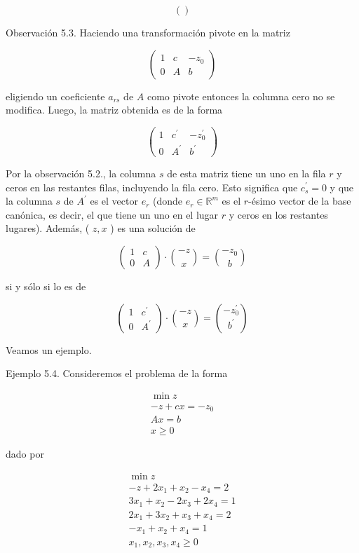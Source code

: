 \documentclass[10pt]{article}
\begin{document}
$$
\left(\right)
$$

Observación 5.3. Haciendo una transformación pivote en la matriz

$$
\left(\begin{array}{cc|c}
1 & c & -z_{0} \\
0 & A & b
\end{array}\right)
$$

eligiendo un coeficiente $a_{r s}$ de $A$ como pivote entonces la columna cero no se modifica. Luego, la matriz obtenida es de la forma

$$
\left(\begin{array}{cc|c}
1 & c^{\prime} & -z_{0}^{\prime} \\
0 & A^{\prime} & b^{\prime}
\end{array}\right)
$$

Por la observación 5.2., la columna $s$ de esta matriz tiene un uno en la fila $r$ y ceros en las restantes filas, incluyendo la fila cero. Esto significa que $c_{s}^{\prime}=0$ y que la columna $s$ de $A^{\prime}$ es el vector $e_{r}$ (donde $e_{r} \in \mathbb{R}^{m}$ es el $r$-ésimo vector de la base canónica, es decir, el que tiene un uno en el lugar $r$ y ceros en los restantes lugares). Además, ( $z, x$ ) es una solución de

$$
\left(\begin{array}{cc}
1 & c \\
0 & A
\end{array}\right) \cdot\binom{-z}{x}=\binom{-z_{0}}{b}
$$

si y sólo si lo es de

$$
\left(\begin{array}{cc}
1 & c^{\prime} \\
0 & A^{\prime}
\end{array}\right) \cdot\binom{-z}{x}=\binom{-z_{0}^{\prime}}{b^{\prime}}
$$

Veamos un ejemplo.

Ejemplo 5.4. Consideremos el problema de la forma

$$
\begin{gathered}
\min z \\
-z+c x=-z_{0} \\
A x=b \\
x \geq 0
\end{gathered}
$$

dado por

$$
\begin{gathered}
\min z \\
-z+2 x_{1}+x_{2}-x_{4}=2 \\
3 x_{1}+x_{2}-2 x_{3}+2 x_{4}=1 \\
2 x_{1}+3 x_{2}+x_{3}+x_{4}=2 \\
-x_{1}+x_{2}+x_{4}=1 \\
x_{1}, x_{2}, x_{3}, x_{4} \geq 0
\end{gathered}
$$
\end{document}
